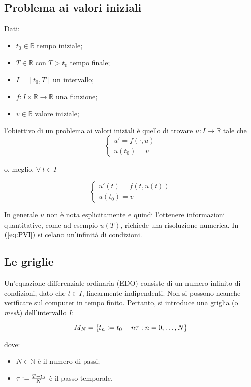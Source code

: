 \documentclass[hidelinks, 10pt]{report}
\begin{document}
\subsection{Problema ai valori iniziali}
Dati:
\begin{itemize}
\item $ t_{0} \in \mathbb{R} $ tempo iniziale;
\item $ T \in \mathbb{R} $ con $ T > t_{0} $ tempo finale;
\item $ I = [t_{0}, T] $ un intervallo;
\item $ f: I \times \mathbb{R} \to \mathbb{R} $ una funzione;
\item $ v \in \mathbb{R} $ valore iniziale;
\end{itemize}

l'obiettivo di un problema ai valori iniziali \`e quello di trovare $ u: I \to \mathbb{R} $ tale che
\[
\begin{cases}
u' = f(\cdot, u) \\
u(t_{0}) = v
\end{cases}
\]

o, meglio, $ \forall\ t \in I $

\begin{equation}	\label{eq:PVI}
\begin{cases}
u'(t) = f \left( t, u(t) \right) \\
u(t_{0}) = v
\end{cases}
\end{equation}

In generale $ u $ non \`e nota esplicitamente e quindi l'ottenere informazioni quantitative, come ad esempio $ u(T) $, richiede una risoluzione numerica. In $ (\ref{eq:PVI}) $ si celano un'infinit\`a di condizioni.

\subsection{Le griglie}
Un'equazione differenziale ordinaria (EDO) consiste di un numero infinito di condizioni, dato che $ t \in I $, linearmente indipendenti. Non si possono neanche verificare sul computer in tempo finito. Pertanto, si introduce una griglia (o \emph{mesh}) dell'intervallo $ I $:

\[ M_{N} = \{ t_{n} \vcentcolon= t_{0} + n \tau : n = 0, \dotsc, N \} \]

dove:
\begin{itemize}
\item $ N \in \mathbb{N} $ \`e il numero di passi;
\item $ \tau \vcentcolon= \frac{T - t_{0}}{N} $ \`e il passo temporale.
\end{itemize}
\end{document}
